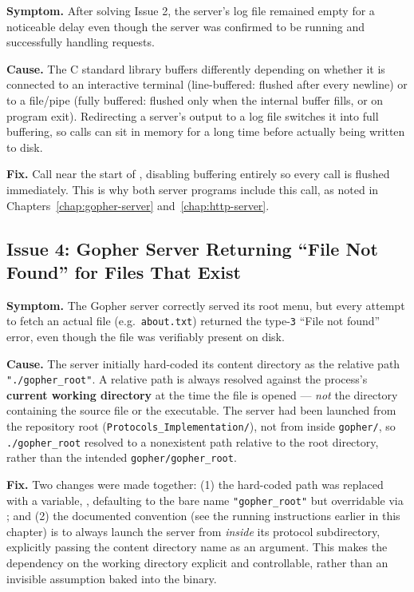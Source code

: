 \textbf{Symptom.} After solving Issue 2, the server's log file remained empty for a noticeable delay even though the server was confirmed to be running and successfully handling requests.

\textbf{Cause.} The C standard library buffers  differently depending on whether it is connected to an interactive terminal (line-buffered: flushed after every newline) or to a file/pipe (fully buffered: flushed only when the internal buffer fills, or on program exit). Redirecting a server's output to a log file switches it into full buffering, so  calls can sit in memory for a long time before actually being written to disk.

\textbf{Fix.} Call  near the start of , disabling buffering entirely so every  call is flushed immediately. This is why both server programs include this call, as noted in Chapters~\ref{chap:gopher-server} and~\ref{chap:http-server}.

\subsection{Issue 4: Gopher Server Returning ``File Not Found'' for Files That Exist}
\label{sec:issue-cwd}

\textbf{Symptom.} The Gopher server correctly served its root menu, but every attempt to fetch an actual file (e.g.\ \texttt{about.txt}) returned the type-\texttt{3} ``File not found'' error, even though the file was verifiably present on disk.

\textbf{Cause.} The server initially hard-coded its content directory as the relative path \texttt{"./gopher\_root"}. A relative path is always resolved against the process's \textbf{current working directory} at the time the file is opened --- \emph{not} the directory containing the source file or the executable. The server had been launched from the repository root (\texttt{Protocols\_Implementation/}), not from inside \texttt{gopher/}, so \texttt{./gopher\_root} resolved to a nonexistent path relative to the root directory, rather than the intended \texttt{gopher/gopher\_root}.

\textbf{Fix.} Two changes were made together: (1) the hard-coded path was replaced with a variable, , defaulting to the bare name \texttt{"gopher\_root"} but overridable via ; and (2) the documented convention (see the running instructions earlier in this chapter) is to always launch the server from \emph{inside} its protocol subdirectory, explicitly passing the content directory name as an argument. This makes the dependency on the working directory explicit and controllable, rather than an invisible assumption baked into the binary.

